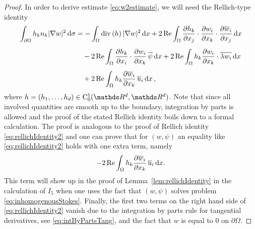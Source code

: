 \begin{proof}
  In order to derive estimate \eqref{eq:w2estimate}, we will need the Rellich-type identity
  \begin{align}
    \int_{\partial\Omega} h_k n_k |\nabla w|^2 \, {\operatorname{d}\!{\sigma}}
    &= - \int_\Omega \mathrm{div\,} (h)\, |\nabla w|^2 \, {\operatorname{d}\!{x}} 
    + 2 \operatorname{Re} \int_\Omega \frac{\partial h_k}{\partial x_j} \cdot \frac{\partial w_i}{\partial x_k} \cdot \frac{\partial \overline w_i}{\partial x_j} \, {\operatorname{d}\!{x}}  \nonumber\\[0.5em]
    &\quad - 2 \operatorname{Re} \int_\Omega \frac{\partial h_k}{\partial x_i} \cdot \frac{\partial w_i}{\partial x_k} \, \overline \psi \, {\operatorname{d}\!{x}} 
    + 2 \operatorname{Re} \int_\Omega h_k \frac{\partial w_i}{\partial x_k} \cdot \overline{ \lambda w_i} \, {\operatorname{d}\!{x}}  \nonumber\\[0.5em]
    &\quad + 2 \operatorname{Re} \int_{\Omega} h_k \frac{\partial \overline w_i}{\partial x_k} \, \overline u_i \, {\operatorname{d}\!{x}}\,, \label{eq:rellichIdentity3}
  \end{align}
  where $h = (h_1, \dots,h_d) \in \CC_0^1(\R^d, \R^d)$.
  Note that since all involved quantities are smooth up to the boundary, integration by parts is allowed and the proof of the stated  Rellich identity boils down to a formal calculation.
  The proof is analogous to the proof of Rellich identity \eqref{eq:rellichIdentity2} and one can prove that for $(w,\psi)$ an equality like \eqref{eq:rellichIdentity2} holds with one extra term, namely
  \begin{align*}
      - 2\operatorname{Re} \int_\Omega h_k \frac{\partial \overline w_i}{\partial x_k} \, \overline u_i \, {\operatorname{d}\!{x}}.
  \end{align*}
  This term will show up in the proof of Lemma~\ref{lem:rellichIdentity} in the calculation of $I_5$ when one uses the fact that $(w,\psi)$ solves problem \eqref{eq:inhomogenousStokes}.
  Finally, the first two terms on the right hand side of \eqref{eq:rellichIdentity2} vanish due to the integration by parts rule for tangential derivatives, see \eqref{eq:intByPartsTang}, and the fact that $w$ is equal to $0$ on  $\partial\Omega$.


\end{proof}
